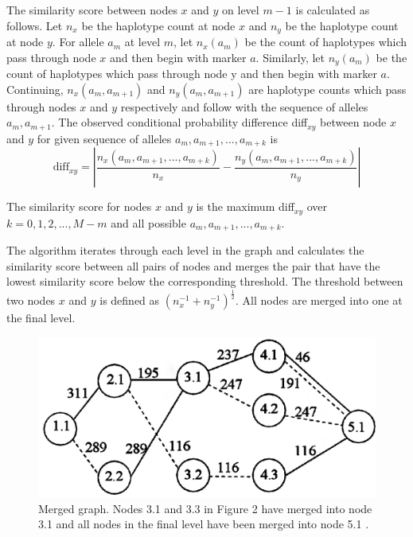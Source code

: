 \documentclass[a4paper,10pt,twoside,abstraction,titlepage]{article}
\begin{document}
The similarity score between nodes $x$ and $y$ on level $m-1$ is calculated as follows.  Let $n_x$ be the haplotype count at node $x$ and $n_y$ be the haplotype count at node $y$.  For allele $a_m$ at level $m$, let $n_x(a_m)$ be the count of haplotypes which pass through node $x$ and then begin with marker $a$.  Similarly, let $n_y(a_m)$ be the count of haplotypes which pass through node y and then begin with marker $a$.  Continuing, $n_x(a_m,a_{m+1})$ and $n_y(a_m,a_{m+1})$ are haplotype counts which pass through nodes $x$ and $y$ respectively and follow with the sequence of alleles $a_m,a_{m+1}$.  The observed conditional probability difference diff$_{xy}$ between node $x$ and $y$ for given sequence of alleles $a_m,a_{m+1},...,a_{m+k}$ is
\begin{equation*}
\mbox{diff}_{xy} = \left|\frac{n_x(a_m,a_{m+1},...,a_{m+k})}{n_x} - \frac{n_y(a_m,a_{m+1},...,a_{m+k})}{n_y}\right|
\end{equation*}


\noindent The similarity score for nodes $x$ and $y$ is the maximum diff$_{xy}$ over $k=0, 1, 2,..., M-m$ and all possible $a_m,a_{m+1},...,a_{m+k}$.

The algorithm iterates through each level in the graph and calculates the similarity score between all pairs of nodes and merges the pair that have the lowest similarity score below the corresponding threshold.  The threshold between two nodes $x$ and $y$ is defined as $(n_x^{-1} + n_y^{-1})^{\frac{1}{2}}$.  All nodes are merged into one at the final level.

\begin{figure}[htp!]

\begin{center}
\centerline{\includegraphics[scale=0.08]{fig4}}
\caption{Merged graph.  Nodes 3.1 and 3.3 in Figure 2 have merged into node 3.1 and all nodes in the final level have been merged into node 5.1 \cite{beagle1}.}

\end{center}
\vspace{-20pt}
\end{figure}
\end{document}
